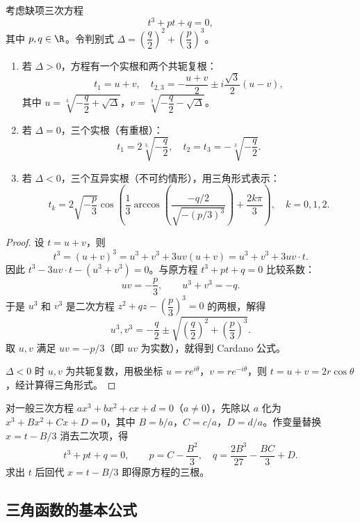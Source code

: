\begin{proposition}
	考虑缺项三次方程
	\[
	t^3 + pt + q = 0,
	\]
	其中 $p, q \in \R$。令判别式 $\Delta = \left(\dfrac{q}{2}\right)^2 + \left(\dfrac{p}{3}\right)^3$。
	\begin{enumerate}
		\item 若 $\Delta > 0$，方程有一个实根和两个共轭复根：
		\[
		t_1 = u + v, \quad t_{2,3} = -\frac{u+v}{2} \pm i\frac{\sqrt{3}}{2}(u-v),
		\]
		其中 $u = \sqrt[3]{-\dfrac{q}{2} + \sqrt{\Delta}}$，$v = \sqrt[3]{-\dfrac{q}{2} - \sqrt{\Delta}}$。
		\item 若 $\Delta = 0$，三个实根（有重根）：
		\[
		t_1 = 2\sqrt[3]{-\frac{q}{2}}, \quad t_2 = t_3 = -\sqrt[3]{-\frac{q}{2}}.
		\]
		\item 若 $\Delta < 0$，三个互异实根（不可约情形），用三角形式表示：
		\[
		t_k = 2\sqrt{-\frac{p}{3}} \cos\left(\frac{1}{3}\arccos\left(\frac{-q/2}{\sqrt{-(p/3)^3}}\right) + \frac{2k\pi}{3}\right), \quad k = 0,1,2.
		\]
	\end{enumerate}
\end{proposition}

\begin{proof}
	设 $t = u + v$，则
	\[
	t^3 = (u+v)^3 = u^3 + v^3 + 3uv(u+v) = u^3 + v^3 + 3uv \cdot t.
	\]
	因此 $t^3 - 3uv \cdot t - (u^3+v^3) = 0$。与原方程 $t^3 + pt + q = 0$ 比较系数：
	\[
	uv = -\frac{p}{3}, \qquad u^3 + v^3 = -q.
	\]
	于是 $u^3$ 和 $v^3$ 是二次方程 $z^2 + qz - \left(\dfrac{p}{3}\right)^3 = 0$ 的两根，解得
	\[
	u^3, v^3 = -\frac{q}{2} \pm \sqrt{\left(\frac{q}{2}\right)^2 + \left(\frac{p}{3}\right)^3}.
	\]
	取 $u, v$ 满足 $uv = -p/3$（即 $uv$ 为实数），就得到 Cardano 公式。
	
	$\Delta < 0$ 时 $u, v$ 为共轭复数，用极坐标 $u = r e^{i\theta}$，$v = r e^{-i\theta}$，则 $t = u+v = 2r\cos\theta$，经计算得三角形式。
\end{proof}


	对一般三次方程 $ax^3 + bx^2 + cx + d = 0$（$a \neq 0$），先除以 $a$ 化为 $x^3 + Bx^2 + Cx + D = 0$，其中 $B = b/a$，$C = c/a$，$D = d/a$。作变量替换 $x = t - B/3$ 消去二次项，得
	\[
	t^3 + pt + q = 0, \qquad p = C - \frac{B^2}{3}, \quad q = \frac{2B^3}{27} - \frac{BC}{3} + D.
	\]
	求出 $t$ 后回代 $x = t - B/3$ 即得原方程的三根。



\subsection*{三角函数的基本公式}

